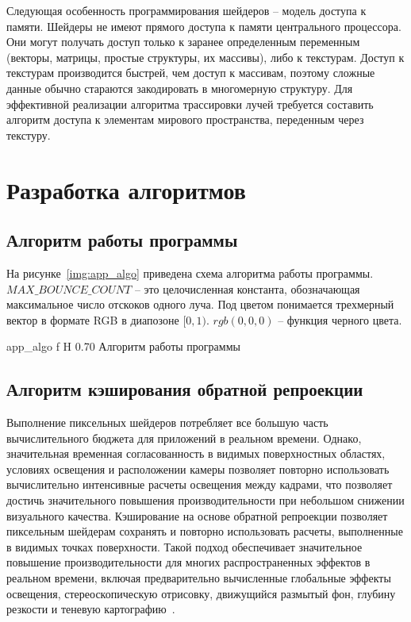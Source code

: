 Следующая особенность программирования шейдеров -- модель доступа к памяти. 
Шейдеры не имеют прямого доступа к памяти центрального процессора. Они могут
получать доступ только к заранее определенным переменным (векторы, матрицы,
простые структуры, их массивы), либо к текстурам. Доступ к текстурам производится
быстрей, чем доступ к массивам, поэтому сложные данные обычно стараются 
закодировать в многомерную структуру. Для эффективной реализации
алгоритма трассировки лучей требуется составить алгоритм доступа к элементам
мирового пространства, переденным через текстуру. 

\section{Разработка алгоритмов}

\subsection{Алгоритм работы программы}

На рисунке~\ref{img:app_algo} приведена схема алгоритма работы программы.
$MAX\_BOUNCE\_COUNT$ -- это целочисленная константа, обозначающая максимальное число
отскоков одного луча. Под цветом понимается
трехмерный вектор в формате RGB в диапозоне $[0, 1)$. $rgb(0,0,0)$ -- функция черного цвета. 

    {app_algo}
    {f}
    {H}
    {0.70\textwidth}
    {Алгоритм работы программы}

\subsection{Алгоритм кэширования обратной репроекции}
Выполнение пиксельных шейдеров потребляет все большую часть вычислительного бюджета для приложений в 
реальном времени. Однако, значительная временная согласованность в видимых поверхностных областях, 
условиях освещения и расположении камеры позволяет повторно использовать вычислительно интенсивные 
расчеты освещения между кадрами, что позволяет достичь значительного повышения производительности 
при небольшом снижении визуального качества. 
Кэширование на основе обратной репроекции позволяет пиксельным шейдерам сохранять и повторно использовать 
расчеты, выполненные в видимых точках поверхности. 
Такой подход обеспечивает значительное повышение производительности для многих распространенных 
эффектов в реальном времени, включая предварительно вычисленные глобальные эффекты освещения, 
стереоскопическую отрисовку, движущийся размытый фон, глубину резкости и теневую картографию~\cite{ARTSwRPC}.

